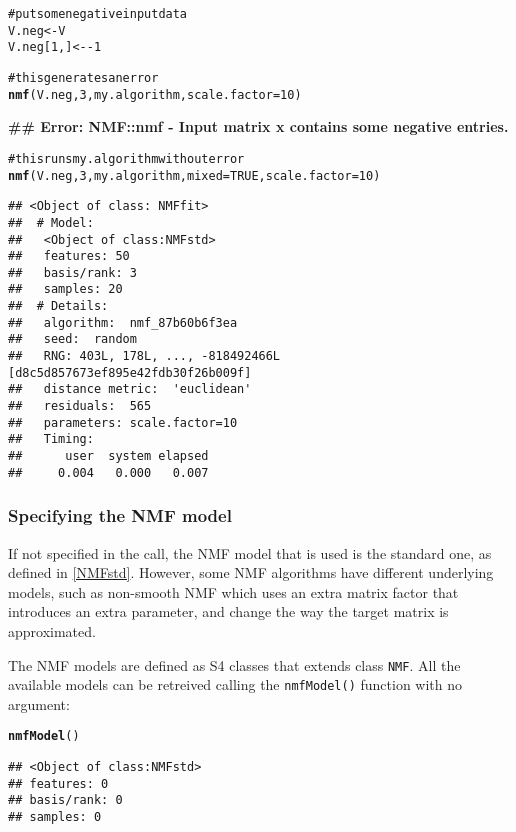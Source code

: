 \documentclass[a4paper]{article}\usepackage{graphicx, color}
\makeatletter
\newcommand{\hlfunctioncall}[1]{\textcolor[rgb]{0.501960784313725,0,0.329411764705882}{\textbf{#1}}}%
\newcommand{\hlcomment}[1]{\textcolor[rgb]{0.180392156862745,0.6,0.341176470588235}{#1}}%
\newenvironment{kframe}{%
 \def\at@end@of@kframe{}%
 \ifinner\ifhmode%
  \def\at@end@of@kframe{\end{minipage}}%
  \begin{minipage}{\columnwidth}%
 \fi\fi%
 \def\FrameCommand##1{\hskip\@totalleftmargin \hskip-\fboxsep
 \colorbox{shadecolor}{##1}\hskip-\fboxsep
     \hskip-\linewidth \hskip-\@totalleftmargin \hskip\columnwidth}%
 \MakeFramed {\advance\hsize-\width
   \@totalleftmargin\z@ \linewidth\hsize
   \@setminipage}}%
 {\par\unskip\endMakeFramed%
 \at@end@of@kframe}
\newenvironment{knitrout}{}{} %
\let\code=\texttt
\renewcommand{\cite}[1]{\parencite{#1}}
\makeatother
\begin{document}
\begin{knitrout}
\color{fgcolor}\begin{kframe}
\begin{alltt}
\hlcomment{# put some negative input data}
V.neg <- V
V.neg[1, ] <- -1

\hlcomment{# this generates an error}
\hlfunctioncall{nmf}(V.neg, 3, my.algorithm, scale.factor = 10)
\end{alltt}


{\ttfamily\noindent\bfseries\textcolor{errorcolor}{\#\# Error: NMF::nmf - Input matrix x contains some negative entries.}}\begin{alltt}

\hlcomment{# this runs my.algorithm without error}
\hlfunctioncall{nmf}(V.neg, 3, my.algorithm, mixed = TRUE, scale.factor = 10)
\end{alltt}
\begin{verbatim}
## <Object of class: NMFfit>
##  # Model:
##   <Object of class:NMFstd>
##   features: 50 
##   basis/rank: 3 
##   samples: 20 
##  # Details:
##   algorithm:  nmf_87b60b6f3ea 
##   seed:  random 
##   RNG: 403L, 178L, ..., -818492466L [d8c5d857673ef895e42fdb30f26b009f]
##   distance metric:  'euclidean' 
##   residuals:  565 
##   parameters: scale.factor=10 
##   Timing:
##      user  system elapsed 
##     0.004   0.000   0.007
\end{verbatim}
\end{kframe}
\end{knitrout}


\subsubsection{Specifying the NMF model}
If not specified in the call, the NMF model that is used is the standard one, as defined in \cref{NMFstd}. 
However, some NMF algorithms have different underlying models, such as non-smooth NMF \cite{Pascual-Montano2006} which uses an extra matrix factor that introduces an extra parameter, and change the way the target matrix is approximated.

The NMF models are defined as S4 classes that extends class \code{NMF}. All the available models can be retreived calling the \code{nmfModel()} function with no 
argument:

\begin{knitrout}
\color{fgcolor}\begin{kframe}
\begin{alltt}
\hlfunctioncall{nmfModel}()
\end{alltt}
\begin{verbatim}
## <Object of class:NMFstd>
## features: 0 
## basis/rank: 0 
## samples: 0
\end{verbatim}
\end{kframe}
\end{knitrout}
\end{document}
